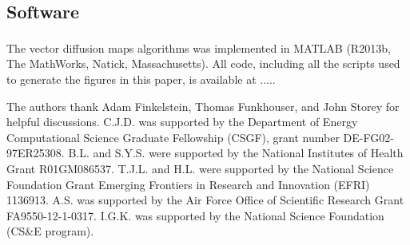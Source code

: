 \documentclass{pnastwo}
\begin{document}
\begin{article}
\begin{materials}
\section{Software}
%
The vector diffusion maps algorithms was implemented in MATLAB\textsuperscript{\textregistered} (R2013b, The MathWorks, Natick, Massachusetts).
%
All code, including all the scripts used to generate the figures in this paper, is available at .....

\end{materials}




\begin{acknowledgments}
The authors thank Adam Finkelstein,  Thomas Funkhouser, and John Storey for helpful discussions. 
%
C.J.D. was supported by the Department of Energy Computational Science Graduate Fellowship (CSGF), grant number DE-FG02-97ER25308.
%
B.L. and S.Y.S. were supported by the National Institutes of Health Grant R01GM086537. 
%
T.J.L. and H.L. were supported by the National Science Foundation Grant Emerging Frontiers in Research and Innovation (EFRI) 1136913.
%
A.S. was supported by the Air Force Office of Scientific Research Grant
FA9550-12-1-0317.
%
I.G.K. was supported by the National Science Foundation (CS\&E program).
\end{acknowledgments}









\end{article}
\end{document}
